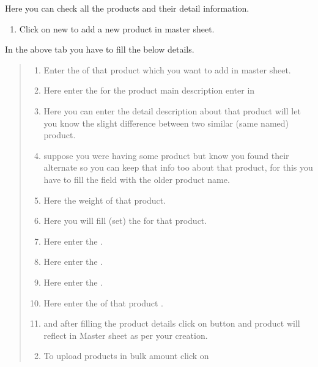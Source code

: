 \documentclass[letterpaper,10pt,english]{sphinxmanual}
\begin{document}
Here you can check all the products and their detail information.
\begin{enumerate}
\item {} 
Click on new to add a new product in master sheet.

\end{enumerate}

\begin{figure}[htbp]
\centering

\noindent{}
\end{figure}

In the above tab you have to fill the below details.
\begin{quote}
\begin{enumerate}
\item {} 
Enter the  of that product which you want to add in master sheet.

\item {} 
Here enter the  for the product main description enter in 

\item {} 
Here you can enter the detail description about that product  will let you know the slight difference between two similar (same named) product.

\item {} 
suppose you were having some product but know you found their alternate so you can keep that info too about that product, for this you have to fill the  field with the older product name.

\item {} 
Here  the weight of that product.

\item {} 
Here you will fill (set) the  for that product.

\item {} 
Here enter the   .

\item {} 
Here enter the  .

\item {} 
Here enter the  .

\item {} 
Here enter the  of that product .

\item {} 
and after filling the product details click on  button and product will reflect in Master sheet as per your creation.

\end{enumerate}
\begin{enumerate}
\setcounter{enumi}{1}
\item {} 
To upload products in bulk amount click on 

\end{enumerate}
\end{quote}
\end{document}
